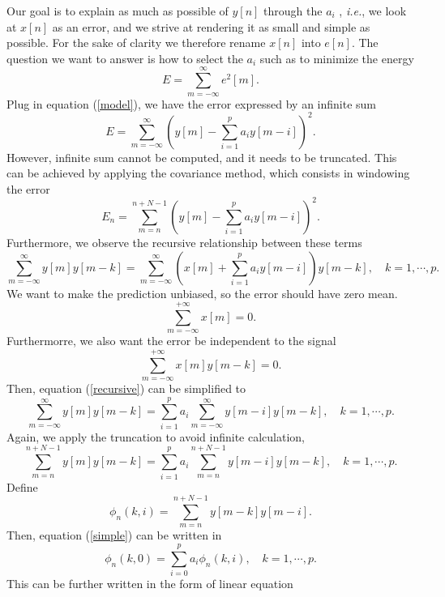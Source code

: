Our goal is to explain as much as possible of \(y[n]\) through the $a_i$ , \textit{i.e.}, we look at \(x[n]\) as an error, and we strive at rendering it as small and simple as possible.\cite{gtm135}
For the sake of clarity we therefore rename \(x[n]\) into \(e[n]\).\cite{cc12}
The question we want to answer is how to select the $a_i$ such as to minimize the energy
\begin{equation}
E=\sum_{m=-\infty}^\infty e^2[m].
\end{equation}
Plug in equation (\ref{model}), we have the error expressed by an infinite sum
\[ E= \sum_{m=-\infty}^\infty \left(y[m]-\sum_{i=1}^p a_i y[m-i] \right)^2. \]
However, infinite sum cannot be computed, and it needs to be truncated.
This can be achieved by applying the covariance method, which consists in windowing the error
\begin{equation}
E_n=\sum_{m=n}^{n+N-1}\left(y[m]-\sum_{i=1}^p a_i y[m-i] \right)^2.
\end{equation}
Furthermore, we observe the recursive relationship between these terms
\begin{equation}\label{recursive}
	\sum_{m=-\infty}^{\infty} y[m]y[m-k]=\sum_{m=-\infty}^{\infty} \left(x[m]+ \sum_{i=1}^p a_iy[m-i]\right)y[m-k], \quad k=1,\cdots,p.
\end{equation}
We want to make the prediction unbiased, so the error should have zero mean.
\[ \sum_{m=-\infty}^{+\infty}x[m]=0. \]
Furthermorre, we also want the error be independent to the signal
\[ \sum_{m=-\infty}^{+\infty}x[m]y[m-k]=0. \]
Then, equation (\ref{recursive}) can be simplified to
\begin{equation}
\sum_{m=-\infty}^{\infty} y[m]y[m-k]=\sum_{i=1}^p a_i\sum_{m=-\infty}^{\infty} y[m-i]y[m-k], \quad k=1,\cdots,p.
\end{equation}
Again, we apply the truncation to avoid infinite calculation,
\begin{equation}\label{simple}
\sum_{m=n}^{n+N-1} y[m]y[m-k]=\sum_{i=1}^p a_i\sum_{m=n}^{n+N-1} y[m-i]y[m-k], \quad k=1,\cdots,p.
\end{equation}
Define
\begin{equation}
\phi_n(k,i)=\sum_{m=n}^{n+N-1} y[m-k]y[m-i].
\end{equation}
Then, equation (\ref{simple}) can be written in
\begin{equation}
\phi_n(k,0)=\sum_{i=0}^p a_i\phi_n(k,i), \quad  k=1,\cdots,p.
\end{equation}
This can be further written in the form of linear equation
